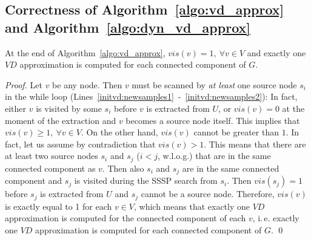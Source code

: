 \documentclass[english]{llncs}
\newcommand{\ie}{i.\,e.\xspace}
\newcommand{\vd}{$\mathit{VD}$\xspace}
\begin{document}
\subsection{Correctness of Algorithm~\ref{algo:vd_approx} and Algorithm~\ref{algo:dyn_vd_approx}}
\begin{lemma}
\label{thm:vd_correctness}
At the end of Algorithm~\ref{algo:vd_approx}, $vis(v)=1,\ \forall v \in V$ and exactly one \vd approximation is computed for each connected component of $G$.
\end{lemma}
\begin{proof}
Let $v$ be any node. Then $v$ must be scanned by \emph{at least} one source node $s_i$ in the while loop (Lines~\ref{initvd:newsamples1}~-~\ref{initvd:newsamples2}): In fact, either $v$ is visited by some $s_i$ before $v$ is extracted from $U$, or $vis(v)=0$ at the moment of the extraction and $v$ becomes a source node itself. This implies that $vis(v) \geq 1, \ \forall v \in V$.
On the other hand, $vis(v)$ cannot be greater than $1$. In fact, let us assume by contradiction that $vis(v)>1$. This means that there are at least two source nodes $s_i$ and $s_j$ ($i<j$, w.l.o.g.) that are in the same connected component as $v$. Then also $s_i$ and $s_j$ are in the same connected component and $s_j$ is visited during the SSSP search from $s_i$. Then $vis(s_j)=1$ before $s_j$ is extracted from $U$ and $s_j$ cannot be a source node.
Therefore, $vis(v)$ is exactly equal to 1 for each $v \in V$, which means that exactly one \vd approximation is computed for the connected component of each $v$, \ie exactly one \vd approximation is computed for each connected component of $G$.
 \qed
\end{proof}
\end{document}
